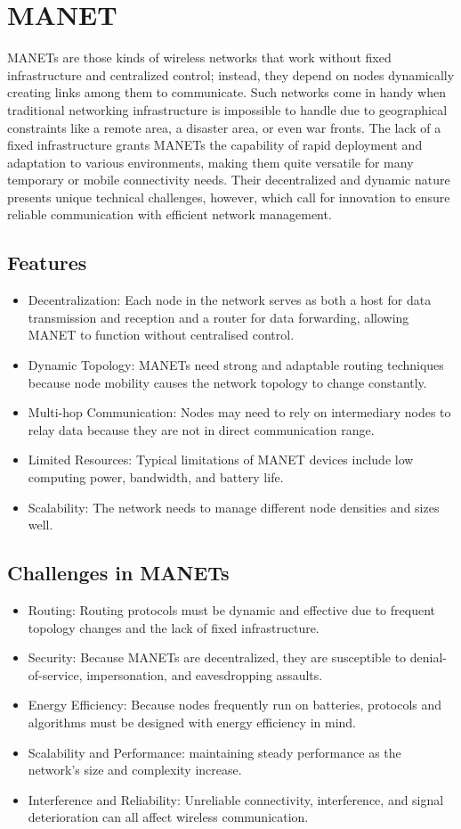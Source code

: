 \documentclass[]{nsm-thesis}
\begin{document}
\section{MANET}
MANETs are those kinds of wireless networks that work without fixed infrastructure and centralized control; instead, they depend on nodes dynamically creating links among them to communicate. Such networks come in handy when traditional networking infrastructure is impossible to handle due to geographical constraints like a remote area, a disaster area, or even war fronts. The lack of a fixed infrastructure grants MANETs the capability of rapid deployment and adaptation to various environments, making them quite versatile for many temporary or mobile connectivity needs. Their decentralized and dynamic nature presents unique technical challenges, however, which call for innovation to ensure reliable communication with efficient network management.\cite{RFC2501}
\subsection{Features}
\begin{itemize}
    \item Decentralization: Each node in the network serves as both a host for data transmission and reception and a router for data forwarding, allowing MANET to function without centralised control.
    \item Dynamic Topology: MANETs need strong and adaptable routing techniques because node mobility causes the network topology to change constantly.
    \item Multi-hop Communication: Nodes may need to rely on intermediary nodes to relay data because they are not in direct communication range.
    \item Limited Resources: Typical limitations of MANET devices include low computing power, bandwidth, and battery life.
    \item Scalability: The network needs to manage different node densities and sizes well.
\end{itemize}

\subsection{Challenges in MANETs}
\begin{itemize}
    \item Routing: Routing protocols must be dynamic and effective due to frequent topology changes and the lack of fixed infrastructure.
    \item Security: Because MANETs are decentralized, they are susceptible to denial-of-service, impersonation, and eavesdropping assaults.
    \item Energy Efficiency: Because nodes frequently run on batteries, protocols and algorithms must be designed with energy efficiency in mind.
    \item Scalability and Performance: maintaining steady performance as the network's size and complexity increase.
    \item Interference and Reliability: Unreliable connectivity, interference, and signal deterioration can all affect wireless communication.
\end{itemize}
\end{document}
